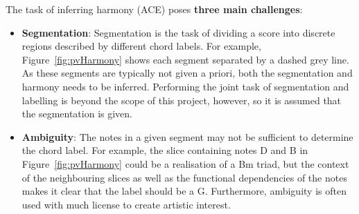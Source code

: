 \documentclass[12pt,a4paper,twoside,openright]{report}
\theoremstyle{definition}
\begin{document}
The task of inferring harmony (ACE) poses \textbf{three main challenges}: 
\begin{itemize}
  \item \textbf{Segmentation}: Segmentation is the task of dividing a score into discrete regions described by different chord labels. For example, Figure~\ref{fig:pvHarmony} shows each segment separated by a dashed grey line. As these segments are typically not given a priori, both the segmentation and harmony needs to be inferred. Performing the joint task of segmentation and labelling is beyond the scope of this project, however, so it is assumed that the segmentation is given.
  \item \textbf{Ambiguity}: The notes in a given segment may not be sufficient to determine the chord label. For example, the slice containing notes D and B in Figure~\ref{fig:pvHarmony} could be a realisation of a Bm triad, but the context of the neighbouring slices as well as the functional dependencies of the notes makes it clear that the label should be a G. Furthermore, ambiguity is often used with much license to create artistic interest.


\end{itemize}
\end{document}
